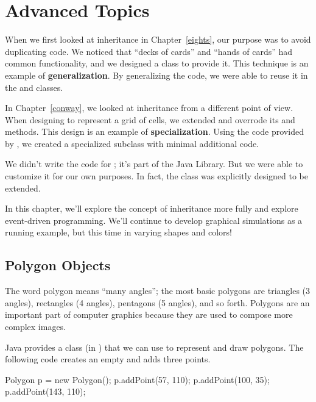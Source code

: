 \chapter{Advanced Topics}


When we first looked at inheritance in Chapter~\ref{eights}, our purpose was to avoid duplicating code.
We noticed that ``decks of cards'' and ``hands of cards'' had common functionality, and we designed a  class to provide it.
This technique is an example of {\bf generalization}.
By generalizing the code, we were able to reuse it in the  and  classes.


In Chapter~\ref{conway}, we looked at inheritance from a different point of view.
When designing  to represent a grid of cells, we extended  and overrode its  and  methods.
This design is an example of {\bf specialization}.
Using the code provided by , we created a specialized subclass with minimal additional code.

We didn't write the code for ; it's part of the Java Library.
But we were able to customize it for our own purposes.
In fact, the  class was explicitly designed to be extended.

In this chapter, we'll explore the concept of inheritance more fully and explore event-driven programming.
We'll continue to develop graphical simulations as a running example, but this time in varying shapes and colors!


\section{Polygon Objects}

The word polygon means ``many angles''; the most basic polygons are triangles (3 angles), rectangles (4 angles), pentagons (5 angles), and so forth.
Polygons are an important part of computer graphics because they are used to compose more complex images.

Java provides a  class (in ) that we can use to represent and draw polygons.
The following code creates an empty  and adds three points.

\begin{code}
Polygon p = new Polygon();
p.addPoint(57, 110);
p.addPoint(100, 35);
p.addPoint(143, 110);
\end{code}


